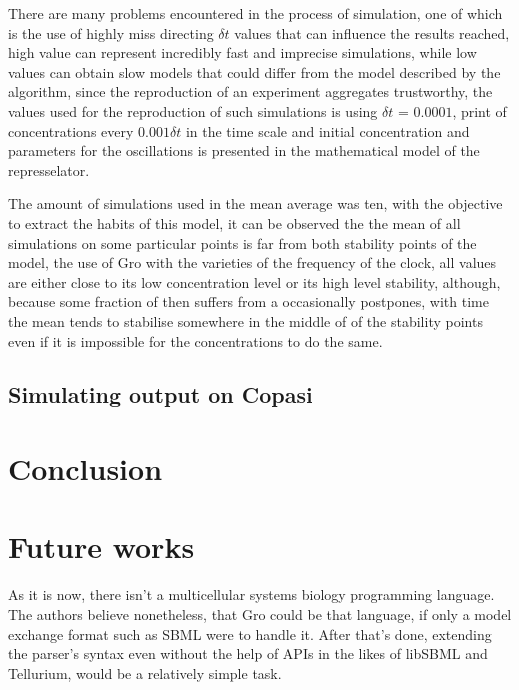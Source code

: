 \documentclass[12pt]{article}
\begin{document}
There are many problems encountered in the process of simulation, one of which is the use of highly miss directing $\delta{t}$ values that can influence the results reached, high value can represent incredibly fast and imprecise simulations, while low values can obtain slow models that could differ from the model described by the algorithm, since the reproduction of an experiment aggregates trustworthy, the values used for the reproduction of such simulations is using $\delta{t}$ = $0.0001$, print of concentrations every $0.001\delta{t}$ in the time scale and initial concentration and parameters for the oscillations is presented in the mathematical model of the represselator.

The amount of simulations used in the mean average was ten, with the objective to extract the habits of this model, it can be observed the the mean of all simulations on some particular points is far from both stability points of the model, the use of Gro with the varieties of the frequency of the clock, all values are either close to its low concentration level or its high level stability, although, because some fraction of then suffers from a occasionally postpones, with time the mean tends to stabilise somewhere in the middle of of the stability points even if it is impossible for the concentrations to do the same.

\subsection{Simulating output on Copasi}
    \lipsum[1]

\section{Conclusion}
    \lipsum[1]
    
\section{Future works}
    As it is now, there isn't a multicellular systems biology programming language. The authors believe nonetheless, that Gro could be that language, if only a model exchange format such as SBML were to handle it. After that's done, extending the parser's syntax even without the help of APIs in the likes of libSBML and Tellurium, would be a relatively simple task.



\end{document}
